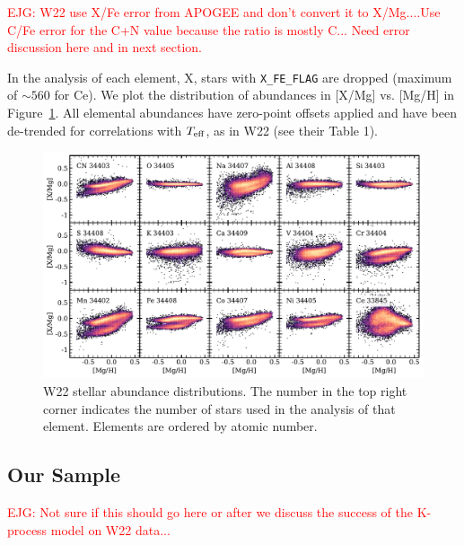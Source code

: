 \documentclass[modern]{aastex631}
\newcommand{\teff}{T_{\rm eff}}
\newcommand{\ejg}[1]{\textcolor{red}{EJG: #1}}
\begin{document}
\ejg{W22 use X/Fe error from APOGEE and don't convert it to X/Mg....Use C/Fe error for the C+N value because the ratio is mostly C... Need error discussion here and in next section.}

In the analysis of each element, X, stars with \texttt{X\_FE\_FLAG} are dropped (maximum of $\sim 560$ for Ce). We plot the distribution of abundances in [X/Mg] vs. [Mg/H] in Figure~\ref{fig:w22_xmg}. All elemental abundances have zero-point offsets applied and have been de-trended for correlations with $\teff$, as in W22 (see their Table 1). 

\begin{figure}[htb!]
    \centering
    \includegraphics[width=\textwidth]{Figures/W22_xmg.pdf}
    \caption{W22 stellar abundance distributions. The number in the top right corner indicates the number of stars used in the analysis of that element. Elements are ordered by atomic number.}
    \label{fig:w22_xmg}
\end{figure}

\subsection{Our Sample}

\ejg{Not sure if this should go here or after we discuss the success of the K-process model on W22 data...}
\end{document}

